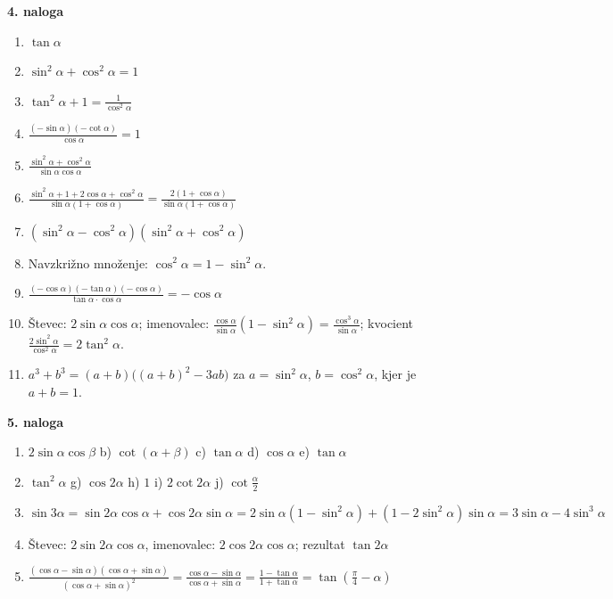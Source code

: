 \documentclass[11pt,a4paper]{article}
\begin{document}
\textbf{4. naloga}
\begin{enumerate}[label=\alph*)]
  \item $\tan\alpha$
  \item $\sin^2\alpha + \cos^2\alpha = 1$
  \item $\tan^2\alpha + 1 = \frac{1}{\cos^2\alpha}$
  \item $\frac{(-\sin\alpha)(-\cot\alpha)}{\cos\alpha} = 1$
  \item $\frac{\sin^2\alpha+\cos^2\alpha}{\sin\alpha\cos\alpha}$
  \item $\frac{\sin^2\alpha + 1 + 2\cos\alpha + \cos^2\alpha}{\sin\alpha(1+\cos\alpha)} = \frac{2(1+\cos\alpha)}{\sin\alpha(1+\cos\alpha)}$
  \item $(\sin^2\alpha-\cos^2\alpha)(\sin^2\alpha+\cos^2\alpha)$
  \item Navzkrižno množenje: $\cos^2\alpha = 1-\sin^2\alpha$.
  \item $\frac{(-\cos\alpha)(-\tan\alpha)(-\cos\alpha)}{\tan\alpha\cdot\cos\alpha} = -\cos\alpha$
  \item Števec: $2\sin\alpha\cos\alpha$; imenovalec: $\frac{\cos\alpha}{\sin\alpha}(1-\sin^2\alpha)=\frac{\cos^3\alpha}{\sin\alpha}$;
        kvocient $\frac{2\sin^2\alpha}{\cos^2\alpha}=2\tan^2\alpha$.
  \item $a^3+b^3=(a+b)\big((a+b)^2-3ab\big)$ za $a=\sin^2\alpha$, $b=\cos^2\alpha$, kjer je $a+b=1$.
\end{enumerate}

\textbf{5. naloga}
\begin{enumerate}[label=\alph*)]
  \item $2\sin\alpha\cos\beta$ \quad b) $\cot(\alpha+\beta)$ \quad c) $\tan\alpha$ \quad d) $\cos\alpha$ \quad e) $\tan\alpha$
  \setcounter{enumii}{5}
  \item $\tan^2\alpha$ \quad g) $\cos 2\alpha$ \quad h) $1$ \quad i) $2\cot 2\alpha$ \quad j) $\cot\frac{\alpha}{2}$
  \setcounter{enumii}{10}
  \item $\sin3\alpha=\sin2\alpha\cos\alpha+\cos2\alpha\sin\alpha = 2\sin\alpha(1-\sin^2\alpha)+(1-2\sin^2\alpha)\sin\alpha = 3\sin\alpha-4\sin^3\alpha$
  \item Števec: $2\sin2\alpha\cos\alpha$, imenovalec: $2\cos2\alpha\cos\alpha$; rezultat $\tan2\alpha$
  \item $\frac{(\cos\alpha-\sin\alpha)(\cos\alpha+\sin\alpha)}{(\cos\alpha+\sin\alpha)^2}=\frac{\cos\alpha-\sin\alpha}{\cos\alpha+\sin\alpha}
        =\frac{1-\tan\alpha}{1+\tan\alpha}=\tan\left(\frac{\pi}{4}-\alpha\right)$
\end{enumerate}
\end{document}
